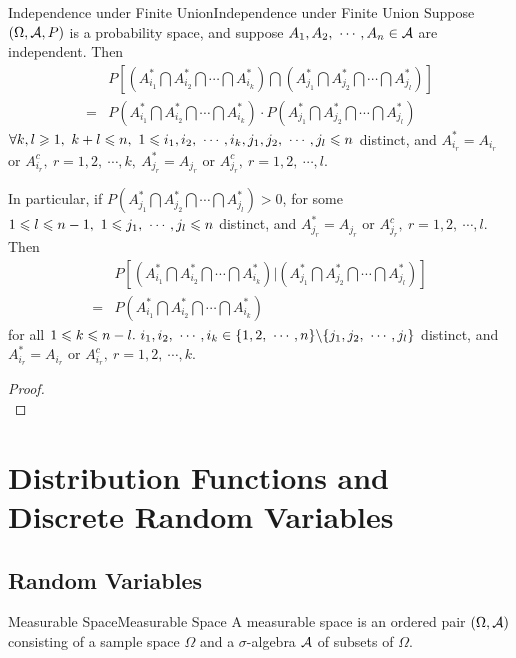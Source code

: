 \documentclass{elegantbook}
\begin{document}
\begin{corollary}{Independence under Finite Union}{Independence under Finite Union}
Suppose $(\Omega,\mathcal{A}, P)$ is a probability space, and suppose $A_1,A_2,\ \cdots,A_n\in\mathcal{A}$ are independent. Then
$$\begin{aligned}
&P\left[\left(A_{i_1}^* \bigcap A_{i_2}^*\bigcap\cdots\bigcap A_{i_k}^*\right)\bigcap\left(A_{j_1}^* \bigcap A_{j_2}^*\bigcap\cdots\bigcap A_{j_l}^* \right)\right] \\
=&P\left(A_{i_1}^*\bigcap A_{i_2}^*\bigcap\cdots\bigcap A_{i_k}^*\right)\cdot P\left(A_{j_1}^*\bigcap A_{j_2}^*\bigcap\cdots\bigcap A_{j_l}^*\right)
\end{aligned}$$
 $\forall k,l\gs1,\ k+l\ls n,\ 1\ls i_1,i_2,\ \cdots,i_k,j_1,j_2,\ \cdots,j_l\ls n$ distinct, and $A_{i_r}^*=A_{i_r}$ or $A_{i_r}^c,\ r=1,2,\ \cdots,k,\ A_{j_r}^*=A_{j_r}$ or $A_{j_r}^c,\ r=1,2,\ \cdots,l.$

In particular, if $P\left(A_{j_1}^* \bigcap A_{j_2}^* \bigcap\cdots\bigcap A_{j_l}^*\right)>0$, for some $1\ls l\ls n-1,\ 1\ls j_1,\ \cdots,j_l\ls n$ distinct, and $A_{j_r}^*=A_{j_r}$ or $A_{j_r}^c,\ r=1,2,\ \cdots,l$. Then 
$$\begin{aligned}
&P\left[\left(A_{i_1}^*\bigcap A_{i_2}^*\bigcap\cdots\bigcap A_{i_k}^*\right)\bigg|\left(A_{j_1}^*\bigcap A_{j_2}^*\bigcap\cdots\bigcap A_{j_l}^*\right)\right]\\
=&P\left(A_{i_1}^*\bigcap A_{i_2}^*\bigcap\cdots\bigcap A_{i_k}^*\right)\end{aligned}$$
 for all $1\ls k\ls n-l.\ i_1,i_2,\ \cdots,i_k\in\{1,2,\ \cdots,n\}\backslash\{j_1,j_2,\ \cdots,j_l \}$ distinct, and $A_{i_r}^*=A_{i_r }$ or $A_{i_r}^c, \ r=1,2,\ \cdots,k$.
\end{corollary}

\begin{proof}
\\[4cm]\vspace{0.01cm}
\end{proof}

\chapter{Distribution Functions and Discrete Random Variables}

\section{Random Variables}

\begin{definition}{Measurable Space}{Measurable Space}
A measurable space is an ordered pair $(\Omega,\mathcal{A})$ consisting of a sample space $\Omega$ and a $\sigma$-algebra $\mathcal{A}$ of subsets of $\Omega$.
\end{definition}
\end{document}
